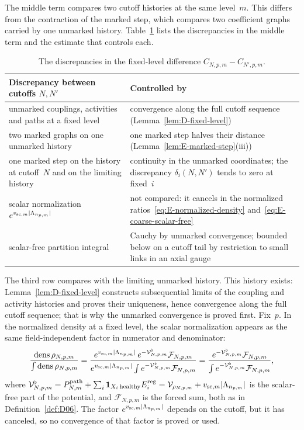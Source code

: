 The middle term compares two cutoff histories at the same level~$m$. This differs from the contraction of the marked step, which compares two coefficient graphs carried by one unmarked history. Table~\ref{tab:E-fixed-level} lists the discrepancies in the middle term and the estimate that controls each.
\begin{table}[ht]
\centering\small
\begin{tabular}{@{}p{}p{}@{}}
\toprule
\raggedright Discrepancy between cutoffs $N,N'$ & \raggedright Controlled by\tabularnewline
\midrule
\raggedright unmarked couplings, activities and paths at a fixed level & \raggedright convergence along the full cutoff sequence (Lemma~\ref{lem:D-fixed-level})\tabularnewline
\raggedright two marked graphs on one unmarked history & \raggedright one marked step halves their distance (Lemma~\ref{lem:E-marked-step}(iii))\tabularnewline
\raggedright one marked step on the history at cutoff~$N$ and on the limiting history & \raggedright continuity in the unmarked coordinates; the discrepancy $\delta_i(N,N')$ tends to zero at fixed~$i$\tabularnewline
\raggedright scalar normalization $e^{v_{{\rm sc},m}|\Lambda_{n_{p,m}}|}$ & \raggedright not compared: it cancels in the normalized ratios~\eqref{eq:E-normalized-density} and~\eqref{eq:E-coarse-scalar-free}\tabularnewline
\raggedright scalar-free partition integral & \raggedright Cauchy by unmarked convergence; bounded below on a cutoff tail by restriction to small links in an axial gauge\tabularnewline
\bottomrule
\end{tabular}
\caption{The discrepancies in the fixed-level difference $C_{N,p,m}-C_{N',p,m}$.}\label{tab:E-fixed-level}
\end{table}
The third row compares with the limiting unmarked history. This history exists: Lemma~\ref{lem:D-fixed-level} constructs subsequential limits of the coupling and activity histories and proves their uniqueness, hence convergence along the full cutoff sequence; that is why the unmarked convergence is proved first. Fix~$p$. In the normalized density at a fixed level, the scalar normalization appears as the same field-independent factor in numerator and denominator:
\begin{equation}\label{eq:E-normalized-density}
\frac{\operatorname{dens}\rho_{N,p,m}}{\int\operatorname{dens}\rho_{N,p,m}}
=\frac{e^{v_{{\rm sc},m}|\Lambda_{n_{p,m}}|}\,e^{-\mathcal V^\flat_{N,p,m}}\mathcal F_{N,p,m}}
{e^{v_{{\rm sc},m}|\Lambda_{n_{p,m}}|}\int e^{-\mathcal V^\flat_{N,p,m}}\mathcal F_{N,p,m}}
=\frac{e^{-\mathcal V^\flat_{N,p,m}}\mathcal F_{N,p,m}}
{\int e^{-\mathcal V^\flat_{N,p,m}}\mathcal F_{N,p,m}},
\end{equation}
where $\mathcal V^\flat_{N,p,m}=P^{\mathrm{path}}_{N,m}+\sum_i\mathbf1_{X_i\,\mathrm{healthy}}E_i^{\rm reg}=\mathcal V_{\rho_{N,p,m}}+v_{{\rm sc},m}|\Lambda_{n_{p,m}}|$ is the scalar-free part of the potential, and $\mathcal F_{N,p,m}$ is the forced sum, both as in Definition~\ref{def:D06}. The factor $e^{v_{{\rm sc},m}|\Lambda_{n_{p,m}}|}$ depends on the cutoff, but it has canceled, so no convergence of that factor is proved or used.

